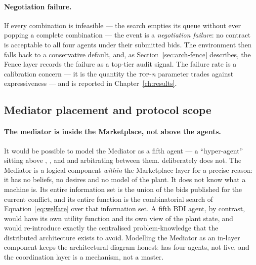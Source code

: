 \paragraph{Negotiation failure.}
If every combination is infeasible --- the search empties its queue
without ever popping a complete combination --- the event is a
\emph{negotiation failure}: no contract is acceptable to all four
agents under their submitted bids. The environment then falls back to a
conservative default, and, as Section~\ref{sec:arch-fence} describes,
the Fence layer records the failure as a top-tier audit signal. The
failure rate is a calibration concern --- it is the quantity the
\textsc{top}-\textit{n} parameter trades against expressiveness --- and is
reported in Chapter~\ref{ch:results}.

\subsection{Mediator placement and protocol scope}
\label{subsec:protocol-scope}

\paragraph{The mediator is inside the Marketplace, not above the agents.}
\label{subsec:mediator-placement}
It would be possible to model the Mediator as a fifth agent --- a
``hyper-agent'' sitting above \PSA{}, \PMA{}, \QCA{} and \SCA{} and
arbitrating between them. \NEXUS{} deliberately does not. The Mediator
is a logical component \emph{within} the Marketplace layer for a precise
reason: it has no beliefs, no desires and no model of the plant. It
does not know what a machine is. Its entire information set is the union
of the bids published for the current conflict, and its entire function
is the combinatorial search of Equation~\eqref{eq:welfare} over that
information set. A fifth BDI agent, by contrast, would have its own
utility function and its own view of the plant state, and would
re-introduce exactly the centralised problem-knowledge that the
distributed architecture exists to avoid. Modelling the Mediator as an
in-layer component keeps the architectural diagram honest: \NEXUS{} has
four agents, not five, and the coordination layer is a mechanism, not a
master.

